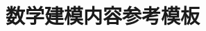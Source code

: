\documentclass{xtan_cumcm}
\begin{document}



\title{数学建模内容参考模板}\author{}\date{}\maketitle\vspace{-5em}  







\newpage




\pagestyle{fancy}\fancyhead{}\fancyfoot[C]{\thepage}


















\end{document}
